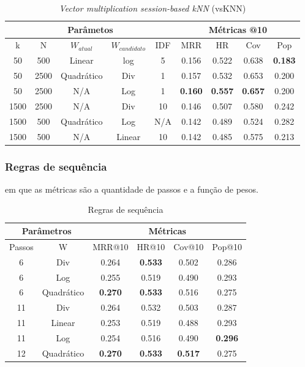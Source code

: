 \begin{table}[htbp]
\centering
  \begin{tabular}{|c|c|c|c|c|c|c|c|c|}
    \hline
    \multicolumn{5}{|c|}{Parâmetos} & \multicolumn{4}{c|}{Métricas @10} \\
    \hline
    k & N & $W_{atual}$ & $W_{candidato}$ & IDF & MRR & HR & Cov & Pop \\
    \hline
    50 & 500 & Linear & log & 5 & 0.156 & 0.522  & 0.638 & \textbf{0.183} \\
    \hline
    50 & 2500 & Quadrático & Div & 1 & 0.157 & 0.532 & 0.653 & 0.200 \\
    \hline
    50 & 2500 & N/A & Log & 1 & \textbf{0.160} & \textbf{0.557} & \textbf{0.657} & 0.200 \\
    \hline
    1500 & 2500 & N/A & Div & 10 & 0.146 & 0.507 & 0.580 & 0.242 \\
    \hline
    1500 & 500 & Quadrático & Log & N/A & 0.142 & 0.489 & 0.524 & 0.282 \\
    \hline
    1500 & 500 & N/A & Linear & 10 & 0.142 & 0.485 & 0.575 & 0.213 \\
    \hline
  \end{tabular}
  \caption{\textit{Vector multiplication session-based kNN} (vsKNN)}
\end{table}

\subsubsection{Regras de sequência}
em que as métricas são a quantidade de passos e a função de pesos.
\begin{table}[htbp]
    \centering
    \begin{tabular}{|c|c|c|c|c|c|}
        \hline
        \multicolumn{2}{|c|}{Parâmetros} & \multicolumn{4}{c|}{Métricas} \\
        \hline
        Passos & W & MRR@10 & HR@10 & Cov@10 & Pop@10 \\
        \hline
        6 & Div & 0.264 & \textbf{0.533} & 0.502 & 0.286 \\
        \hline
        6 & Log & 0.255 & 0.519 & 0.490 & 0.293 \\
        \hline
        6 & Quadrático & \textbf{0.270} & \textbf{0.533} & 0.516 & 0.275 \\
        \hline
        11 & Div & 0.264 & 0.532 & 0.503 & 0.287 \\
        \hline
        11 & Linear & 0.253 & 0.519 & 0.488 & 0.293 \\
        \hline
        11 & Log & 0.254 & 0.516 & 0.490 & \textbf{0.296} \\
        \hline
        12 & Quadrático & \textbf{0.270} & \textbf{0.533} & \textbf{0.517} & 0.275 \\
        \hline
        \end{tabular}
    \caption{Regras de sequência}
\end{table}


